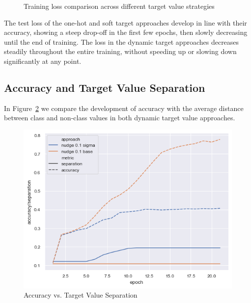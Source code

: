 \documentclass[12pt,fleqn,a4paper]{article}
\begin{document}
\begin{figure}[H]
\centering
{}
\hfill
{}
\caption{Training loss comparison across different target value strategies}
\label{fig:loss}
\end{figure}

The test loss of the one-hot and soft target approaches develop in line with their accuracy, showing a steep drop-off in the first few epochs, then slowly decreasing until the end of training. The loss in the dynamic target approaches decreases steadily throughout the entire training, without speeding up or slowing down significantly at any point.

\subsection{Accuracy and Target Value Separation}
In Figure~\ref{fig:accvsep} we compare the development of accuracy with the average distance between class and non-class values in both dynamic target value approaches.

\begin{figure}[H]
    \centering
    \includegraphics[width=0.6\linewidth]{graphs/accvsep.png}
    \caption{Accuracy vs. Target Value Separation}
    \label{fig:accvsep}
\end{figure}
\end{document}
